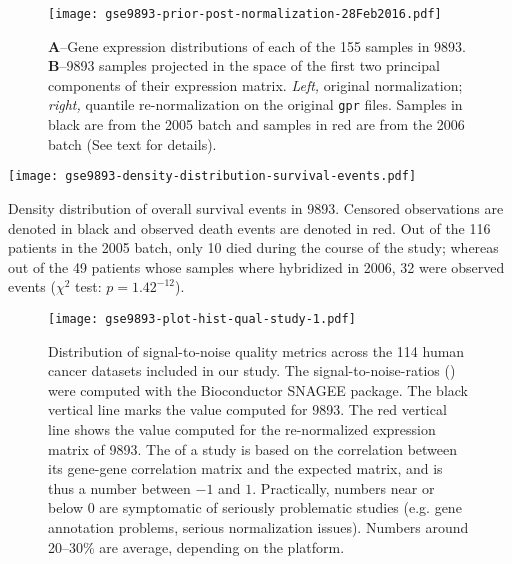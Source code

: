 \begin{figure}%
  \begin{center}
    \texttt{[image: gse9893-prior-post-normalization-28Feb2016.pdf]}
    \caption[Batch effect in 9893 prior and post
    re-normalization]{\textbf{A}--Gene expression distributions of each of the
      155 samples in 9893. \mbox{\textbf{B}--9893}
      samples projected in the space of the first two principal components of
      their expression matrix.  \emph{Left,} original normalization;
      \emph{right,} quantile re-normalization on the original \texttt{gpr}
      files.  Samples in black are from the 2005 batch and samples in red are
      from the 2006 batch (See text for details).}
    \label{fig:gse9893-prior-post-norm}
  \end{center}
\end{figure}

\begin{marginfigure}%
  \begin{center}
    \texttt{[image: gse9893-density-distribution-survival-events.pdf]}
    \caption[Density distribution of overall survival events in
    9893]{Density distribution of overall survival
      events in 9893. Censored observations are denoted
      in black and observed death events are denoted in red.  Out of
      the 116 patients in the 2005 batch, only 10 died during the
      course of the study; whereas out of the 49 patients whose
      samples where hybridized in 2006, 32 were observed events
      ($\chi^2$ test: $p = 1.42^{-12}$).}
    \label{fig:km-gse9893-density-survival}
  \end{center}
\end{marginfigure}

\begin{figure}%
  \begin{center}
    \texttt{[image: gse9893-plot-hist-qual-study-1.pdf]}
    \caption[Distribution of signal-to-noise quality metrics across 114 human
    cancer datasets]{Distribution of signal-to-noise quality metrics across the
      114 human cancer datasets included in our study. The
      signal-to-noise-ratios () were computed with the
      \textsf{Bioconductor SNAGEE} package.  The black vertical line marks the
      value computed for 9893.  The red vertical line shows the
      value computed for the re-normalized expression matrix of
      9893.  The  of a study is based on the
      correlation between its gene-gene correlation matrix and the expected
      matrix, and is thus a number between $-1$ and $1$.  Practically, numbers
      near or below 0 are symptomatic of seriously problematic studies
      (e.g. gene annotation problems, serious normalization issues).  Numbers
      around 20--30\% are average, depending on the platform.}
    \label{fig:gse9893-snr}
  \end{center}
\end{figure}

